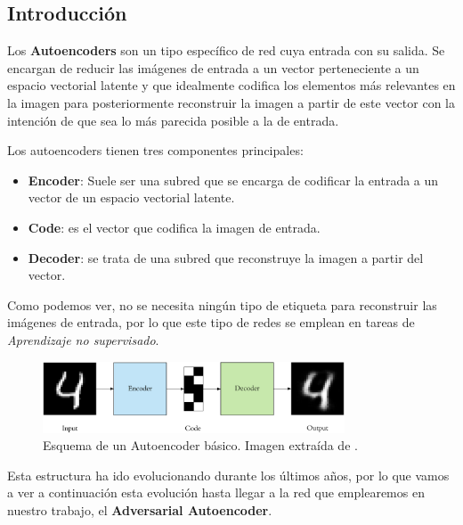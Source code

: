     \subsection{Introducción}
        \noindent Los \textbf{Autoencoders} \cite{autoencoders2017} son un tipo específico de red cuya entrada  con su salida. Se encargan de reducir las imágenes de entrada a un vector perteneciente a un espacio vectorial latente y que idealmente codifica los elementos más relevantes en la imagen para posteriormente reconstruir la imagen a partir de este vector con la intención de que sea lo más parecida posible a la de entrada.

        \medskip

        \noindent Los autoencoders tienen tres componentes principales: 

        \begin{itemize}
            \item \textbf{Encoder}: Suele ser una subred que se encarga de codificar la entrada a un vector de un espacio vectorial latente. 
            \item \textbf{Code}: es el vector que codifica la imagen de entrada. 
            \item \textbf{Decoder}: se trata de una subred que reconstruye la imagen a partir del vector.
        \end{itemize}

        \noindent Como podemos ver, no se necesita ningún tipo de etiqueta para reconstruir las imágenes de entrada, por lo que este tipo de redes se emplean en tareas de \textit{Aprendizaje no supervisado}.

        \begin{figure}[!h]
            \centering
            \includegraphics[width=0.8\textwidth]{img/Autoencoder.png}
            \caption{Esquema de un Autoencoder básico. Imagen extraída de \cite{autoencoders2017}.}
            \label{fig:Autoencoder}
        \end{figure}

        \medskip 

        \noindent Esta estructura ha ido evolucionando durante los últimos años, por lo que vamos a ver a continuación esta evolución hasta llegar a la red que emplearemos en nuestro trabajo, el \textbf{Adversarial Autoencoder}.

